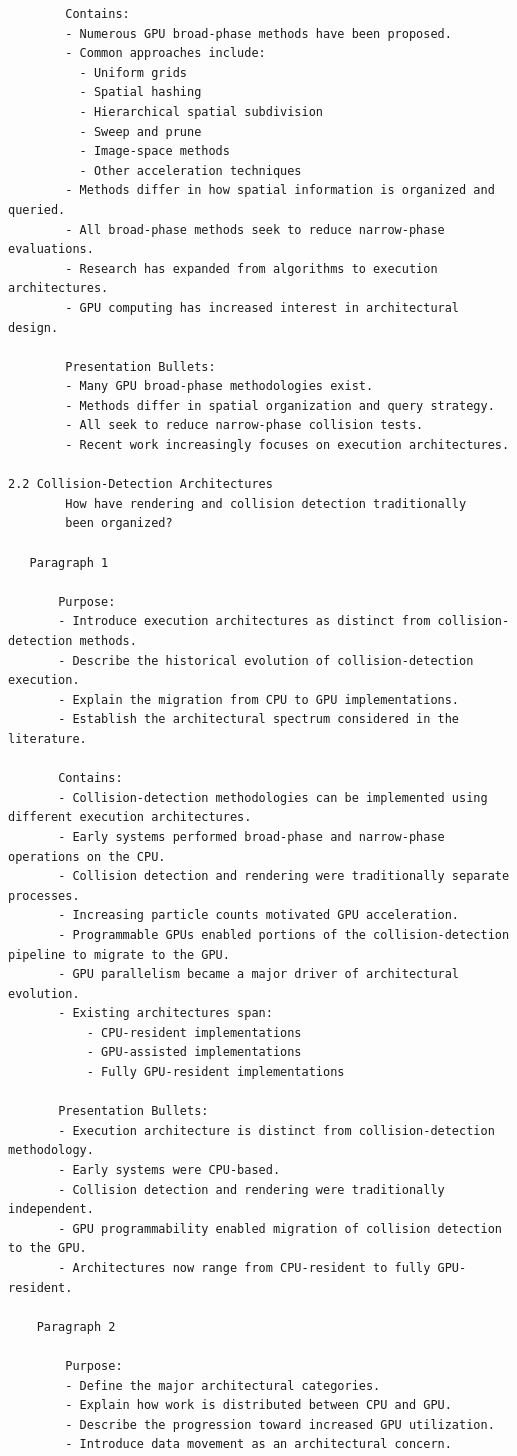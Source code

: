 \begin{verbatim}
		Contains:
		- Numerous GPU broad-phase methods have been proposed.
		- Common approaches include:
		  - Uniform grids
		  - Spatial hashing
		  - Hierarchical spatial subdivision
		  - Sweep and prune
		  - Image-space methods
		  - Other acceleration techniques
		- Methods differ in how spatial information is organized and queried.
		- All broad-phase methods seek to reduce narrow-phase evaluations.
		- Research has expanded from algorithms to execution architectures.
		- GPU computing has increased interest in architectural design.

		Presentation Bullets:
		- Many GPU broad-phase methodologies exist.
		- Methods differ in spatial organization and query strategy.
		- All seek to reduce narrow-phase collision tests.
		- Recent work increasingly focuses on execution architectures.

2.2 Collision-Detection Architectures
		How have rendering and collision detection traditionally
		been organized?

   Paragraph 1

	   Purpose:
	   - Introduce execution architectures as distinct from collision-detection methods.
	   - Describe the historical evolution of collision-detection execution.
	   - Explain the migration from CPU to GPU implementations.
	   - Establish the architectural spectrum considered in the literature.

	   Contains:
	   - Collision-detection methodologies can be implemented using different execution architectures.
	   - Early systems performed broad-phase and narrow-phase operations on the CPU.
	   - Collision detection and rendering were traditionally separate processes.
	   - Increasing particle counts motivated GPU acceleration.
	   - Programmable GPUs enabled portions of the collision-detection pipeline to migrate to the GPU.
	   - GPU parallelism became a major driver of architectural evolution.
	   - Existing architectures span:
		   - CPU-resident implementations
		   - GPU-assisted implementations
		   - Fully GPU-resident implementations

	   Presentation Bullets:
	   - Execution architecture is distinct from collision-detection methodology.
	   - Early systems were CPU-based.
	   - Collision detection and rendering were traditionally independent.
	   - GPU programmability enabled migration of collision detection to the GPU.
	   - Architectures now range from CPU-resident to fully GPU-resident.

	Paragraph 2

		Purpose:
		- Define the major architectural categories.
		- Explain how work is distributed between CPU and GPU.
		- Describe the progression toward increased GPU utilization.
		- Introduce data movement as an architectural concern.


\end{verbatim}
